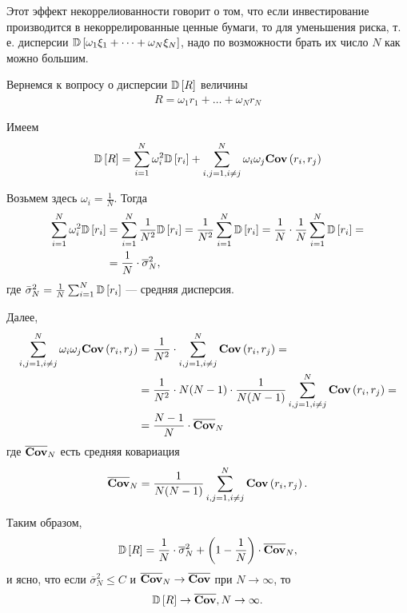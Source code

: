 Этот эффект некоррелиованности говорит о том, что если инвестирование производится в некоррелированные ценные бумаги, то для уменьшения риска,
т. е. дисперсии $\mathbb{D}\left[\omega_1 \xi_1 + \dots + \omega_N \xi_N\right]$, надо по возможности брать их число $N$ как можно большим.

Вернемся к вопросу о дисперсии $\mathbb{D}\left[R\right]$ величины
\begin{align}
	R = \omega_1 r_1 + \dots + \omega_N r_N
\end{align}

Имеем
\begin{align}
	\mathbb{D}\left[R\right] = \sum_{i=1}^{N} \omega_i^2 \mathbb{D}\left[r_i\right] + \sum_{i, j = 1, i \ne j}^{N} \omega_i \omega_j \textbf{Cov}\left(r_i, r_j\right)
\end{align}

Возьмем здесь $\omega_i = \frac{1}{N}$. Тогда
\begin{align}
	\sum_{i=1}^{N} \omega_i^2 \mathbb{D}\left[r_i\right]
	&= \sum_{i=1}^{N} \frac{1}{N^2} \mathbb{D}\left[r_i\right]
	= \frac{1}{N^2} \sum_{i=1}^{N} \mathbb{D}\left[r_i\right]
	= \frac{1}{N} \cdot \frac{1}{N} \sum_{i=1}^{N} \mathbb{D}\left[r_i\right] = \\
	&= \frac{1}{N} \cdot \overline{\sigma}_N^2 ,
\end{align}
где $\bar{\sigma}_N^2 = \frac{1}{N} \sum_{i=1}^{N} \mathbb{D}\left[r_i\right]$ --- средняя дисперсия. 

Далее,
\begin{align}
	\sum_{i, j = 1, i \ne j}^{N} \omega_i \omega_j \textbf{Cov}\left(r_i, r_j\right)
	&= \frac{1}{N^2} \cdot \sum_{i, j = 1, i \ne j}^{N} \textbf{Cov}\left(r_i, r_j\right) = \\
	&= \frac{1}{N^2} \cdot N (N-1) \cdot \frac{1}{N (N-1)} \sum_{i, j = 1, i \ne j}^{N} \textbf{Cov}\left(r_i, r_j\right) = \\
	&= \frac{N-1}{N} \cdot \overline{\textbf{Cov}}_N
\end{align}
где $\overline{\textbf{Cov}}_N$ есть средняя ковариация
\begin{align}
\overline{\textbf{Cov}}_N = \frac{1}{N (N - 1)} \sum_{i, j = 1, i \ne j}^{N} \textbf{Cov}\left(r_i, r_j\right) .
\end{align}

Таким образом,
\begin{align} \label{eq:DR_decomposition}
	\mathbb{D}\left[R\right] = \frac{1}{N} \cdot \overline{\sigma}_N^2 + \left(1 - \frac{1}{N}\right) \cdot \overline{\textbf{Cov}}_N ,
\end{align}
и ясно, что если $\overline{\sigma}_N^2 \le C$ и $\overline{\textbf{Cov}}_N \rightarrow \overline{\textbf{Cov}}$ при $N \rightarrow \infty$, то
\begin{align}
	\mathbb{D}\left[R\right] \rightarrow \overline{\textbf{Cov}}, N \rightarrow \infty .
\end{align}

